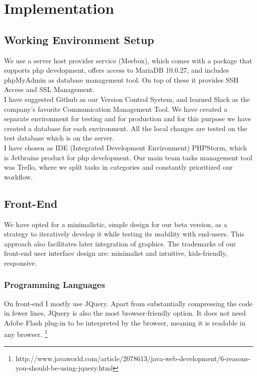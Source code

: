 \chapter{Implementation}

\section{Working Environment Setup} 

We use a server host provider service (Meebox), which comes with a package that supports php development, offers access to MariaDB 10.0.27, and includes phpMyAdmin as database management tool. On top of these it provides SSH Access and SSL Management.\\

I have suggested Github as our Version Control System, and learned Slack as the company's favorite Communication Management Tool. 
We have created a separate environment for testing and for production and for this purpose we have created a database for each environment. All the local changes are tested on the test database which is on the server.\\

I have chosen as IDE (Integrated Development Environment) PHPStorm, which is Jetbrains product for php development. Our main team tasks management tool was Trello, where we split tasks in categories and constantly prioritized our workflow.

\section{Front-End}

We have opted for a minimalistic, simple design for our beta version, as a strategy to iteratively develop it while testing its usability with end-users. This approach also facilitates later integration of graphics. The trademarks of our front-end user interface design are: minimalist and intuitive, kids-friendly, responsive.\\

\subsection{Programming Languages} 

On front-end I mostly use JQuery. Apart from substantially compressing the code in fewer lines, JQuery is also the most browser-friendly option. It does not need Adobe Flash plug-in to be interpreted by the browser, meaning it is readable in any browser.
\footnote{http://www.javaworld.com/article/2078613/java-web-development/6-reasons-you-should-be-using-jquery.html}
\\

